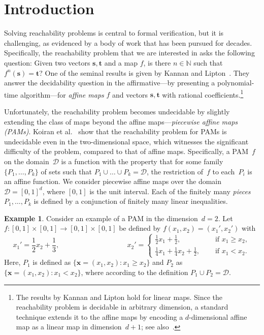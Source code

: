 \documentclass[preprint,12pt]{elsarticle}
\theoremstyle{plain}
\theoremstyle{definition}
\newtheorem{example}[theorem]{Example}
\theoremstyle{remark}
\theoremstyle{claimstyle}
\newcommand{\NN}{\mathbb{N}}
\begin{document}
\section{Introduction}
Solving reachability problems is central to formal verification, but it is challenging, as evidenced by a body of work that has been pursued for decades.
Specifically, the reachability problem that we are interested in asks the following question: 
Given two vectors $\bm{s}, \bm{t}$ and a map $f$, is there $n\in  \NN$ such that $f^n(\bm{s}) = \bm{t}$? 
One of the seminal results is given by Kannan and Lipton~\cite{kannan1980decid,kannan1986poly}.
They answer the decidability question in the affirmative---by presenting a polynomial-time algorithm---for \emph{affine maps} $f$ and vectors $\bm{s}, \bm{t}$ with rational coefficients.\footnote{The results by Kannan and Lipton hold for linear maps. Since the reachability problem is decidable in arbitrary dimension, a standard technique extends it to the affine maps by encoding a $d$-dimensional affine map as a linear map in dimension~$d+1$; see also~\cite[Section~5]{Tiwari2005termination}.}

Unfortunately, the reachability problem becomes undecidable by slightly extending the class of maps beyond the affine maps---\emph{piecewise affine maps (PAMs)}. 
Koiran et al.~\cite{koiran1994pam} show that the reachability problem for PAMs is undecidable even in the two-dimensional space, 
which witnesses the significant difficulty of the problem, compared to that of affine maps. 
Specifically, a PAM~$f$ on the domain~$\mathcal{D}$ is a function with the property that
for some family~$\{P_1, \dots, P_k\}$ of sets 
such that $P_1 \cup \dots \cup P_k = \mathcal{D}$, 
the restriction of~$f$ to each~$P_i$ is an affine function.
We consider piecewise affine maps over the domain~$\mathcal{D} = [0,1]^d$, where $[0,1]$ is the unit interval.
Each of the finitely many \emph{pieces}~$P_1, \dots, P_k$ is defined by a conjunction of finitely many linear inequalities.

\begin{example}\label{ex:intro}
	Consider an example of a PAM in the dimension~$d=2$. Let
\(f : [0,1]\times[0,1] \rightarrow  [0,1]\times[0,1]\) be defined by $f(x_1, x_2) = (x_1', x_2')$ with
\begin{equation*}
	x_1' = \frac{1}{2}x_2 + \frac{1}{3}, \hspace{4cm}
	x_2' =	\begin{cases}
		\frac{1}{2}x_1 + \frac{1}{2},\quad &\text{ if $x_1 \geq x_2$},\\
		\frac{1}{4}x_1 + \frac{1}{4}x_2 + \frac{1}{2}, \quad &\text{ if $x_1 < x_2$.}
	\end{cases}
\end{equation*}
Here, $P_1$ is defined as $\{\bm{x} = (x_1, x_2) : x_1 \geq x_2\}$ and $P_2$ as $\{\bm{x} = (x_1, x_2) : x_1 < x_2\}$,
where according to the definition $P_1 \cup P_2 = \mathcal{D}$.
\end{example}
\end{document}
